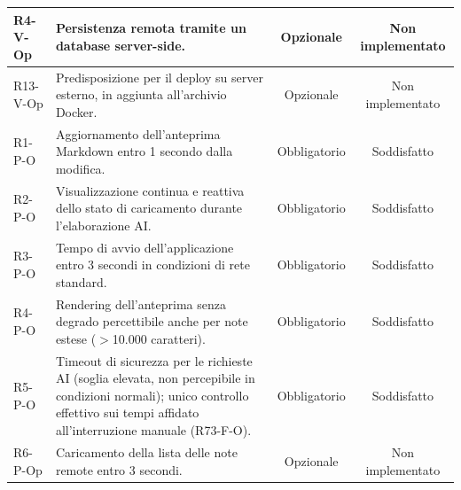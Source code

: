 \begin{xltabular}{\textwidth}{|>{\centering\arraybackslash}p{2.6cm}|X|c|c|}
	R4-V-Op & Persistenza remota tramite un database server-side. & Opzionale & Non implementato \\ \hline
	R13-V-Op & Predisposizione per il deploy su server esterno, in aggiunta all'archivio Docker. & Opzionale & Non implementato \\ \hline
	R1-P-O & Aggiornamento dell'anteprima Markdown entro 1 secondo dalla modifica. & Obbligatorio & Soddisfatto \\ \hline
	R2-P-O & Visualizzazione continua e reattiva dello stato di caricamento durante l'elaborazione AI. & Obbligatorio & Soddisfatto \\ \hline
	R3-P-O & Tempo di avvio dell'applicazione entro 3 secondi in condizioni di rete standard. & Obbligatorio & Soddisfatto \\ \hline
	R4-P-O & Rendering dell'anteprima senza degrado percettibile anche per note estese ($>$10.000 caratteri). & Obbligatorio & Soddisfatto \\ \hline
	R5-P-O & Timeout di sicurezza per le richieste AI (soglia elevata, non percepibile in condizioni normali); unico controllo effettivo sui tempi affidato all'interruzione manuale (R73-F-O). & Obbligatorio & Soddisfatto \\ \hline
	R6-P-Op & Caricamento della lista delle note remote entro 3 secondi. & Opzionale & Non implementato \\ \hline
\end{xltabular}
